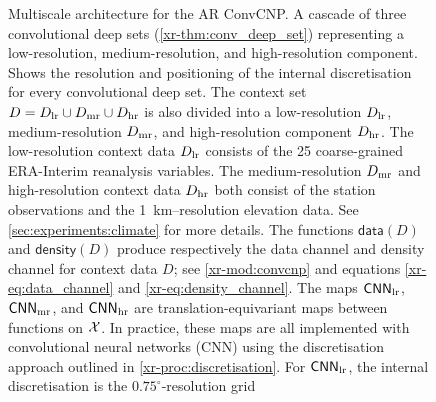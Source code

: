 \documentclass[12pt, twoside]{report}
\newcommand{\xrprefix}[1]{xr-#1}
\begin{document}
\begin{figure}[t]
    \captionsetup{font=footnotesize}
    \caption[
        Multiscale architecture for the AR ConvCNP
    ]{
        \footnotesize
        Multiscale architecture for the AR ConvCNP.
        A cascade of three convolutional deep sets (\cref{\xrprefix{thm:conv_deep_set}})
        representing a low-resolution, medium-resolution, and high-resolution component.
        Shows the resolution and positioning of the internal discretisation for every convolutional deep set.
        The context set $D = D\ss{lr} \cup D\ss{mr} \cup D\ss{hr}$ is also divided into
        a low-resolution $D\ss{lr}$, medium-resolution $D\ss{mr}$,
        and high-resolution component $D\ss{hr}$.
        The low-resolution context data $D\ss{lr}$ consists of the 25 coarse-grained ERA-Interim reanalysis variables.
        The medium-resolution $D\ss{mr}$ and high-resolution context data $D\ss{hr}$ both consist of the station observations and the \SI{1}{km}--resolution elevation data.
        See \cref{sec:experiments:climate} for more details.
        The functions $\mathsf{data}(D)$ and $\mathsf{density}(D)$ produce respectively the data channel
        and density channel for context data $D$;
        see \cref{\xrprefix{mod:convcnp}} and equations \eqref{\xrprefix{eq:data_channel}} and \eqref{\xrprefix{eq:density_channel}}.
        The maps $\mathsf{CNN}\ss{lr}$, $\mathsf{CNN}\ss{mr}$, and $\mathsf{CNN}\ss{hr}$
        are translation-equivariant maps between functions on $\mathcal{X}$.
        In practice, these maps are all implemented with convolutional neural networks (CNN)
        using the discretisation approach outlined in \cref{\xrprefix{proc:discretisation}}.
        For $\mathsf{CNN}\ss{lr}$, the internal discretisation is the $0.75^\circ$-resolution grid
}
\end{figure}
\end{document}
